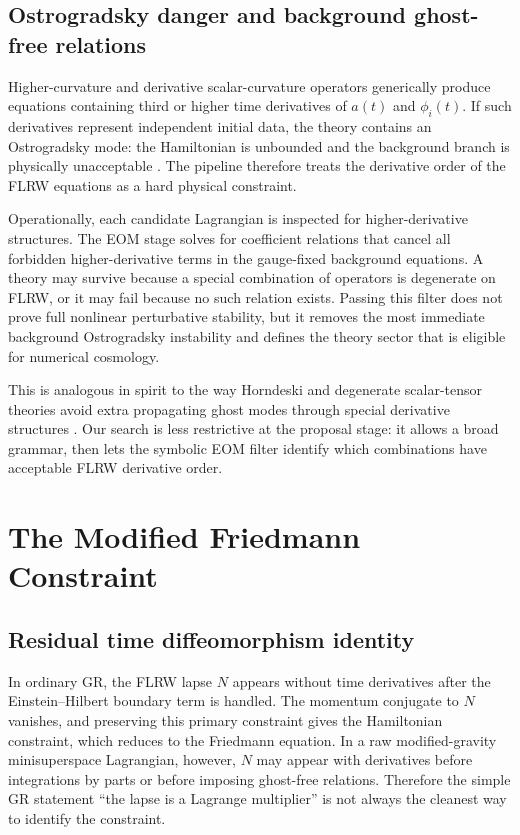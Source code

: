 \documentclass[aps,prd,twocolumn,superscriptaddress,nofootinbib,longbibliography]{revtex4-2}
\begin{document}
\subsection{Ostrogradsky danger and background ghost-free relations}
\label{subsec:ostro}

Higher-curvature and derivative scalar-curvature operators generically produce equations containing third or higher time derivatives of $a(t)$ and $\phi_i(t)$.  If such derivatives represent independent initial data, the theory contains an Ostrogradsky mode: the Hamiltonian is unbounded and the background branch is physically unacceptable \cite{Ostrogradsky1850}.  The pipeline therefore treats the derivative order of the FLRW equations as a hard physical constraint.

Operationally, each candidate Lagrangian is inspected for higher-derivative structures.  The EOM stage solves for coefficient relations that cancel all forbidden higher-derivative terms in the gauge-fixed background equations.  A theory may survive because a special combination of operators is degenerate on FLRW, or it may fail because no such relation exists.  Passing this filter does not prove full nonlinear perturbative stability, but it removes the most immediate background Ostrogradsky instability and defines the theory sector that is eligible for numerical cosmology.

This is analogous in spirit to the way Horndeski and degenerate scalar-tensor theories avoid extra propagating ghost modes through special derivative structures \cite{Horndeski1974,Langlois2016DHOST}.  Our search is less restrictive at the proposal stage: it allows a broad grammar, then lets the symbolic EOM filter identify which combinations have acceptable FLRW derivative order.

\section{The Modified Friedmann Constraint}
\label{sec:hamiltonian}

\subsection{Residual time diffeomorphism identity}
\label{subsec:noether}

In ordinary GR, the FLRW lapse $N$ appears without time derivatives after the Einstein--Hilbert boundary term is handled.  The momentum conjugate to $N$ vanishes, and preserving this primary constraint gives the Hamiltonian constraint, which reduces to the Friedmann equation.  In a raw modified-gravity minisuperspace Lagrangian, however, $N$ may appear with derivatives before integrations by parts or before imposing ghost-free relations.  Therefore the simple GR statement ``the lapse is a Lagrange multiplier'' is not always the cleanest way to identify the constraint.
\end{document}
